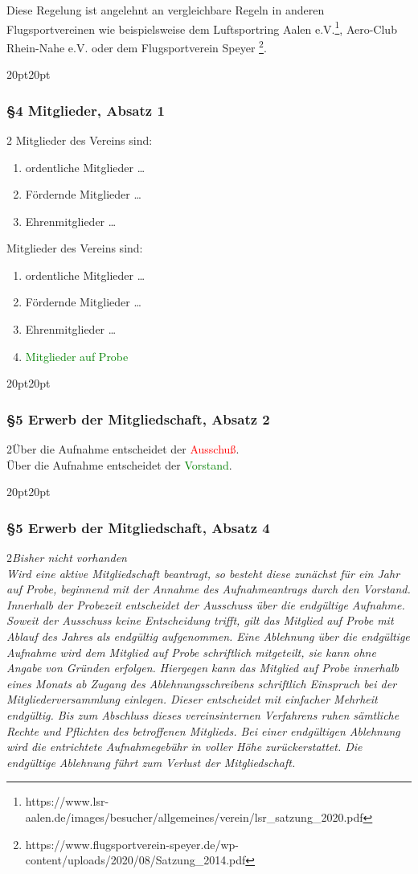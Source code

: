 \documentclass[10pt,a4paper,parskip=half]{scrartcl}
\newcommand{\new}[1]{\textcolor{Green}{#1}}
\newcommand{\old}[1]{\textcolor{Red}{#1}}
\newcommand{\change}[1]{
  \begin{adjustwidth}{20pt}{20pt}
    #1
  \end{adjustwidth}
}
\newcommand{\compare}[3]{\change{\subsubsection*{#1}\begin{multicols}{2}#2\columnbreak\\#3\end{multicols}}}
\begin{document}
Diese Regelung ist angelehnt an vergleichbare Regeln in anderen Flugsportvereinen wie beispielsweise dem Luftsportring Aalen e.V.\footnote{https://www.lsr-aalen.de/images/besucher/allgemeines/verein/lsr\_satzung\_2020.pdf}, Aero-Club Rhein-Nahe e.V. oder dem Flugsportverein Speyer \footnote{https://www.flugsportverein-speyer.de/wp-content/uploads/2020/08/Satzung\_2014.pdf}.

\change{
  \subsubsection*{§4 Mitglieder, Absatz 1}
  \begin{multicols}{2}
    Mitglieder des Vereins sind:
    \begin{enumerate}[noitemsep]
      \item ordentliche Mitglieder \dots
      \item Fördernde Mitglieder \dots
      \item Ehrenmitglieder \dots
    \end{enumerate}
    \columnbreak
    Mitglieder des Vereins sind:
    \begin{enumerate}[noitemsep]
      \item ordentliche Mitglieder \dots
      \item Fördernde Mitglieder \dots
      \item Ehrenmitglieder \dots
      \item \new{Mitglieder auf Probe}
    \end{enumerate}
  \end{multicols}
}

\compare{§5 Erwerb der Mitgliedschaft, Absatz 2}{Über die Aufnahme entscheidet der \old{Ausschuß}.}{Über die Aufnahme entscheidet der \new{Vorstand}.}
\clearpage
\compare{§5 Erwerb der Mitgliedschaft, Absatz 4}{\em Bisher nicht vorhanden \em}{Wird eine aktive Mitgliedschaft beantragt,
  so besteht diese zunächst für ein Jahr auf Probe,
  beginnend mit der Annahme des Aufnahmeantrags durch den Vorstand.
  Innerhalb der Probezeit entscheidet der Ausschuss über die endgültige Aufnahme.
  Soweit der Ausschuss keine Entscheidung trifft,
  gilt das Mitglied auf Probe mit Ablauf des Jahres als endgültig aufgenommen.
  Eine Ablehnung über die endgültige Aufnahme wird dem Mitglied auf Probe schriftlich mitgeteilt,
  sie kann ohne Angabe von Gründen erfolgen.
  Hiergegen kann das Mitglied auf Probe innerhalb eines Monats ab Zugang des Ablehnungsschreibens schriftlich Einspruch bei der Mitgliederversammlung einlegen.
  Dieser entscheidet mit einfacher Mehrheit endgültig.
  Bis zum Abschluss dieses vereinsinternen Verfahrens ruhen sämtliche Rechte und Pflichten des betroffenen Mitglieds.
  Bei einer endgültigen Ablehnung wird die entrichtete Aufnahmegebühr in voller Höhe zurückerstattet.
  Die endgültige Ablehnung führt zum Verlust der Mitgliedschaft.}
\end{document}
